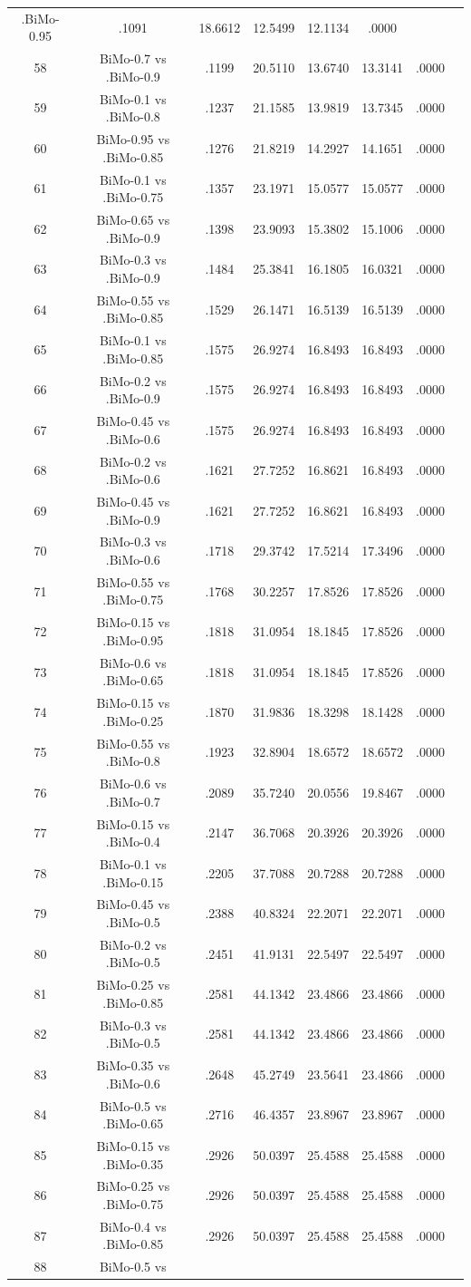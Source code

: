 \documentclass[a4paper,10pt]{article}
\begin{document}
\begin{landscape}
\begin{table}[!htp]
\begin{tabular}{cccccccc}
.BiMo-0.95&.1091&18.6612&12.5499&12.1134&.0000\\58&BiMo-0.7 vs .BiMo-0.9&.1199&20.5110&13.6740&13.3141&.0000\\59&BiMo-0.1 vs .BiMo-0.8&.1237&21.1585&13.9819&13.7345&.0000\\60&BiMo-0.95 vs .BiMo-0.85&.1276&21.8219&14.2927&14.1651&.0000\\61&BiMo-0.1 vs .BiMo-0.75&.1357&23.1971&15.0577&15.0577&.0000\\62&BiMo-0.65 vs .BiMo-0.9&.1398&23.9093&15.3802&15.1006&.0000\\63&BiMo-0.3 vs .BiMo-0.9&.1484&25.3841&16.1805&16.0321&.0000\\64&BiMo-0.55 vs .BiMo-0.85&.1529&26.1471&16.5139&16.5139&.0000\\65&BiMo-0.1 vs .BiMo-0.85&.1575&26.9274&16.8493&16.8493&.0000\\66&BiMo-0.2 vs .BiMo-0.9&.1575&26.9274&16.8493&16.8493&.0000\\67&BiMo-0.45 vs .BiMo-0.6&.1575&26.9274&16.8493&16.8493&.0000\\68&BiMo-0.2 vs .BiMo-0.6&.1621&27.7252&16.8621&16.8493&.0000\\69&BiMo-0.45 vs .BiMo-0.9&.1621&27.7252&16.8621&16.8493&.0000\\70&BiMo-0.3 vs .BiMo-0.6&.1718&29.3742&17.5214&17.3496&.0000\\71&BiMo-0.55 vs .BiMo-0.75&.1768&30.2257&17.8526&17.8526&.0000\\72&BiMo-0.15 vs .BiMo-0.95&.1818&31.0954&18.1845&17.8526&.0000\\73&BiMo-0.6 vs .BiMo-0.65&.1818&31.0954&18.1845&17.8526&.0000\\74&BiMo-0.15 vs .BiMo-0.25&.1870&31.9836&18.3298&18.1428&.0000\\75&BiMo-0.55 vs .BiMo-0.8&.1923&32.8904&18.6572&18.6572&.0000\\76&BiMo-0.6 vs .BiMo-0.7&.2089&35.7240&20.0556&19.8467&.0000\\77&BiMo-0.15 vs .BiMo-0.4&.2147&36.7068&20.3926&20.3926&.0000\\78&BiMo-0.1 vs .BiMo-0.15&.2205&37.7088&20.7288&20.7288&.0000\\79&BiMo-0.45 vs .BiMo-0.5&.2388&40.8324&22.2071&22.2071&.0000\\80&BiMo-0.2 vs .BiMo-0.5&.2451&41.9131&22.5497&22.5497&.0000\\81&BiMo-0.25 vs .BiMo-0.85&.2581&44.1342&23.4866&23.4866&.0000\\82&BiMo-0.3 vs .BiMo-0.5&.2581&44.1342&23.4866&23.4866&.0000\\83&BiMo-0.35 vs .BiMo-0.6&.2648&45.2749&23.5641&23.4866&.0000\\84&BiMo-0.5 vs .BiMo-0.65&.2716&46.4357&23.8967&23.8967&.0000\\85&BiMo-0.15 vs .BiMo-0.35&.2926&50.0397&25.4588&25.4588&.0000\\86&BiMo-0.25 vs .BiMo-0.75&.2926&50.0397&25.4588&25.4588&.0000\\87&BiMo-0.4 vs .BiMo-0.85&.2926&50.0397&25.4588&25.4588&.0000\\88&BiMo-0.5 vs 
\end{tabular}
\end{table}
\end{landscape}
\end{document}
